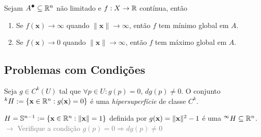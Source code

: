 \begin{lemma}
    Sejam \(A\ce\subseteq \R^n\) não limitado e \(f:X\to \mathbb{R}\) contínua, então  
    \begin{enumerate}[label=\roman*.]
        \item Se \(f(\textbf{x})\to \infty \) quando \(\|\textbf{x}\|\to \infty \), então \(f\) tem mínimo global em \(A\).
        \item Se \(f(\textbf{x}) \to 0\) quando \(\|\textbf{x}\|\to \infty\), então \(f\) tem máximo global em \(A\).
    \end{enumerate}   
\end{lemma}


\subsection*{Problemas com Condições}

\begin{definition}
    Seja  \(g\in C^k(U)\) tal que \(\forall p\in U : g(p)=0\), \(dg(p)\neq 0\). O conjunto \(^k H:= \{\textbf{x} \in \mathbb{R}^n : g(\textbf{x}) = 0\}\) é uma \emph{hipersuperfície} de classe \(C^k\). 
\end{definition}

\begin{example}
    \(H=\mathbb{S}^{n-1} := \{\textbf{x}\in \mathbb{R}^n: \|\textbf{x}\| = 1\}\) definida por \(g(\textbf{x})= \|\textbf{x}\|^2- 1 \) é uma \(^\infty H \subseteq \mathbb{R}^n\). \textcolor{gray}{\(\rightarrow \) Verifique a condição \(g(p)=0 \Rightarrow dg(p)\neq 0\)} 
\end{example}


